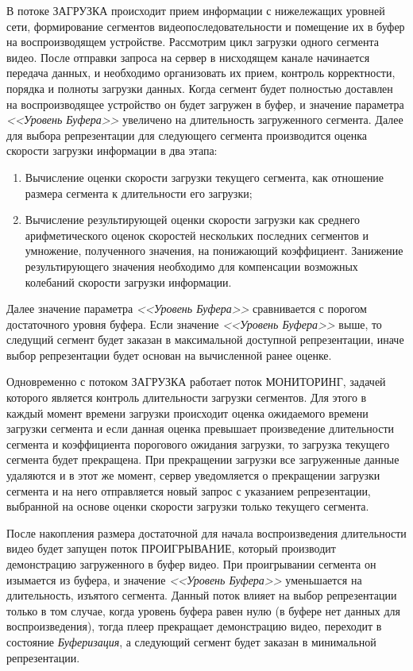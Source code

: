 В потоке ЗАГРУЗКА происходит прием информации с нижележащих уровней сети, формирование сегментов видеопоследовательности и помещение их в буфер на воспроизводящем устройстве. Рассмотрим цикл загрузки одного сегмента видео. После отправки запроса на сервер в нисходящем канале начинается передача данных, и необходимо организовать их прием, контроль корректности, порядка и полноты загрузки данных. Когда сегмент будет полностью доставлен на воспроизводящее устройство он будет загружен в буфер, и значение параметра \textit{<<Уровень Буфера>>} увеличено на длительность загруженного сегмента. Далее для выбора репрезентации для следующего сегмента производится оценка скорости загрузки информации в два этапа:
\begin{enumerate}
  \item Вычисление оценки скорости загрузки текущего сегмента, как отношение размера сегмента к длительности его загрузки;
  \item Вычисление результирующей оценки скорости загрузки как среднего арифметического оценок скоростей нескольких последних сегментов и умножение, полученного значения, на понижающий коэффициент. Занижение результирующего значения необходимо для компенсации возможных колебаний скорости загрузки информации.
\end{enumerate}
Далее значение параметра \textit{<<Уровень Буфера>>} сравнивается с порогом достаточного уровня буфера. Если значение \textit{<<Уровень Буфера>>} выше, то следущий сегмент будет заказан в максимальной доступной репрезентации, иначе выбор репрезентации будет основан на вычисленной ранее оценке.

Одновременно с потоком ЗАГРУЗКА работает поток МОНИТОРИНГ, задачей которого является контроль длительности загрузки сегментов. Для этого в каждый момент времени загрузки происходит оценка ожидаемого времени загрузки сегмента и если данная оценка превышает произведение длительности сегмента и коэффициента порогового ожидания загрузки, то загрузка текущего сегмента будет прекращена. При прекращении загрузки все загруженные данные удаляются и в этот же момент, сервер уведомляется о прекращении загрузки сегмента и на него отправляется новый запрос с указанием репрезентации, выбранной на основе оценки скорости загрузки только текущего сегмента.

После накопления размера достаточной для начала воспроизведения длительности видео будет запущен поток ПРОИГРЫВАНИЕ, который производит демонстрацию загруженного в буфер видео. При проигрывании сегмента он изымается из буфера, и значение \textit{<<Уровень Буфера>>} уменьшается на длительность, изъятого сегмента. Данный поток влияет на выбор репрезентации только в том случае, когда уровень буфера равен нулю (в буфере нет данных для воспроизведения), тогда плеер прекращает демонстрацию видео, переходит в состояние \textit{Буферизация}, а следующий сегмент будет заказан в минимальной репрезентации.

